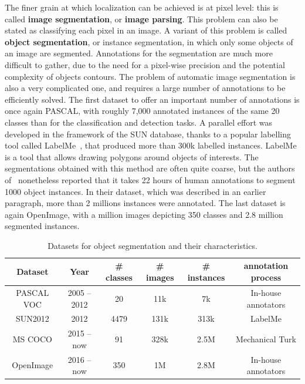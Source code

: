 The finer grain at which localization can be achieved is at pixel level:
this is called \textbf{image segmentation}, or \textbf{image parsing}.
This problem can also be stated as classifying each pixel in an image.
A variant of this problem is called \textbf{object segmentation},
or instance segmentation, in which only some objects of an image are segmented.
Annotations for the segmentation are much more difficult to gather,
due to the need for a pixel-wise precision
and the potential complexity of objects contours.
The problem of automatic image segmentation is also a very complicated one,
and requires a large number of annotations to be efficiently solved.
The first dataset to offer an important number of annotations is once again PASCAL,
with roughly 7,000 annotated instances of the same 20 classes
than for the classification and detection tasks.
A parallel effort was developed in the framework of the SUN database,
thanks to a popular labelling tool called LabelMe~\cite{russell2008labelme},
that produced more than 300k labelled instances.
LabelMe is a tool that allows drawing polygons around objects of interests.
The segmentations obtained with this method are often quite coarse,
but the authors of~\cite{lin2014microsoft} nonetheless reported that
it takes 22 hours of human annotations to segment 1000 object instances.
In their dataset, which was described in an earlier paragraph,
more than 2 millions instances were annotated.
The last dataset is again OpenImage, with a million images depicting 350 classes
and 2.8 million segmented instances.

\vspace{0.5cm}
\begin{table}
	\centering
	\caption{Datasets for object segmentation and their characteristics.}
	\begin{tabular}{|c|c|c|c|c|c|}
		\hline
		Dataset & Year & \# classes & \# images & \# instances & annotation process \\
		\hline
		PASCAL VOC \cite{Everingham10} & 2005 -- 2012 & 20 & 11k & 7k & In-house annotators \\
		SUN2012 \cite{xiao2010sun} & 2012 & 4479 & 131k & 313k & LabelMe \cite{russell2008labelme,barriuso2012notes} \\
		MS COCO \cite{lin2014microsoft} & 2015 -- now & 91 & 328k & 2.5M & Mechanical Turk \\
		OpenImage \cite{OpenImages, OpenImages2} & 2016 -- now & 350 & 1M & 2.8M & In-house annotators \\
		\hline
	\end{tabular}
	\label{tab:segmentation_ds}
\end{table}


